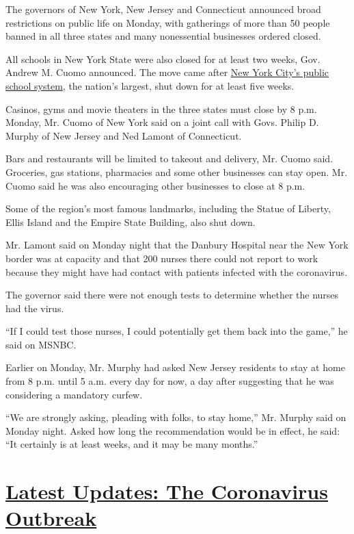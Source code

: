 The governors of New York, New Jersey and Connecticut announced broad
restrictions on public life on Monday, with gatherings of more than 50
people banned in all three states and many nonessential businesses
ordered closed.

All schools in New York State were also closed for at least two weeks,
Gov. Andrew M. Cuomo announced. The move came after
\href{https://www.nytimes3xbfgragh.onion/2020/03/16/nyregion/nyc-schools-closed-coronavirus.html}{New
York City's public school system}, the nation's largest, shut down for
at least five weeks.

Casinos, gyms and movie theaters in the three states must close by 8
p.m. Monday, Mr. Cuomo of New York said on a joint call with Govs.
Philip D. Murphy of New Jersey and Ned Lamont of Connecticut.

Bars and restaurants will be limited to takeout and delivery, Mr. Cuomo
said. Groceries, gas stations, pharmacies and some other businesses can
stay open. Mr. Cuomo said he was also encouraging other businesses to
close at 8 p.m.

Some of the region's most famous landmarks, including the Statue of
Liberty, Ellis Island and the Empire State Building, also shut down.

Mr. Lamont said on Monday night that the Danbury Hospital near the New
York border was at capacity and that 200 nurses there could not report
to work because they might have had contact with patients infected with
the coronavirus.

The governor said there were not enough tests to determine whether the
nurses had the virus.

``If I could test those nurses, I could potentially get them back into
the game,'' he said on MSNBC.

Earlier on Monday, Mr. Murphy had asked New Jersey residents to stay at
home from 8 p.m. until 5 a.m. every day for now, a day after suggesting
that he was considering a mandatory curfew.

``We are strongly asking, pleading with folks, to stay home,'' Mr.
Murphy said on Monday night. Asked how long the recommendation would be
in effect, he said: ``It certainly is at least weeks, and it may be many
months.''

\hypertarget{latest-updates-the-coronavirus-outbreak}{%
\section{\texorpdfstring{\href{https://www.nytimes3xbfgragh.onion/2020/08/17/world/coronavirus-covid.html?action=click\&pgtype=Article\&state=default\&region=MAIN_CONTENT_1\&context=storylines_live_updates}{Latest
Updates: The Coronavirus
Outbreak}}{Latest Updates: The Coronavirus Outbreak}}\label{latest-updates-the-coronavirus-outbreak}}

